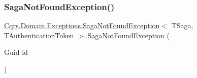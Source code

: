 \subsubsection{\texorpdfstring{Saga\+Not\+Found\+Exception()}{SagaNotFoundException()}}
{\footnotesize\ttfamily \hyperlink{classCqrs_1_1Domain_1_1Exceptions_1_1SagaNotFoundException}{Cqrs.\+Domain.\+Exceptions.\+Saga\+Not\+Found\+Exception}$<$ T\+Saga, T\+Authentication\+Token $>$.\hyperlink{classCqrs_1_1Domain_1_1Exceptions_1_1SagaNotFoundException}{Saga\+Not\+Found\+Exception} (\begin{DoxyParamCaption}\item[{Guid}]{id }\end{DoxyParamCaption})}

